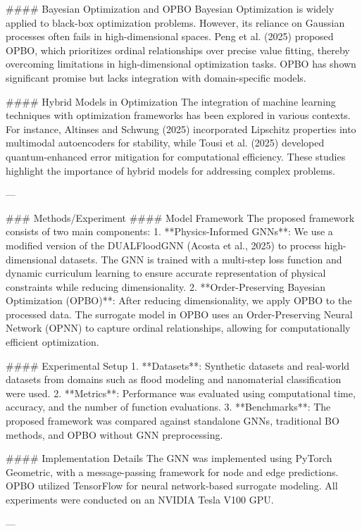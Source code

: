 #### Bayesian Optimization and OPBO  
Bayesian Optimization is widely applied to black-box optimization problems. However, its reliance on Gaussian processes often fails in high-dimensional spaces. Peng et al. (2025) proposed OPBO, which prioritizes ordinal relationships over precise value fitting, thereby overcoming limitations in high-dimensional optimization tasks. OPBO has shown significant promise but lacks integration with domain-specific models.

#### Hybrid Models in Optimization  
The integration of machine learning techniques with optimization frameworks has been explored in various contexts. For instance, Altinses and Schwung (2025) incorporated Lipschitz properties into multimodal autoencoders for stability, while Tousi et al. (2025) developed quantum-enhanced error mitigation for computational efficiency. These studies highlight the importance of hybrid models for addressing complex problems.

---

### Methods/Experiment  
#### Model Framework  
The proposed framework consists of two main components:  
1. **Physics-Informed GNNs**: We use a modified version of the DUALFloodGNN (Acosta et al., 2025) to process high-dimensional datasets. The GNN is trained with a multi-step loss function and dynamic curriculum learning to ensure accurate representation of physical constraints while reducing dimensionality.  
2. **Order-Preserving Bayesian Optimization (OPBO)**: After reducing dimensionality, we apply OPBO to the processed data. The surrogate model in OPBO uses an Order-Preserving Neural Network (OPNN) to capture ordinal relationships, allowing for computationally efficient optimization.

#### Experimental Setup  
1. **Datasets**: Synthetic datasets and real-world datasets from domains such as flood modeling and nanomaterial classification were used.  
2. **Metrics**: Performance was evaluated using computational time, accuracy, and the number of function evaluations.  
3. **Benchmarks**: The proposed framework was compared against standalone GNNs, traditional BO methods, and OPBO without GNN preprocessing.  

#### Implementation Details  
The GNN was implemented using PyTorch Geometric, with a message-passing framework for node and edge predictions. OPBO utilized TensorFlow for neural network-based surrogate modeling. All experiments were conducted on an NVIDIA Tesla V100 GPU.

---

